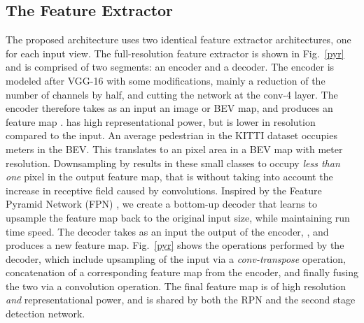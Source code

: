 \documentclass[letterpaper, 10 pt, conference]{ieeeconf}
\newcommand{\fig}[1]{Fig.~\ref{#1}}
\begin{document}
\subsection{The Feature Extractor}
\label{extract}
The proposed architecture uses two identical feature extractor architectures, one for each input view. The full-resolution feature extractor is shown in \fig{pyr} and is comprised of two segments: an encoder and a decoder. The encoder is modeled after VGG-16 \cite{simonyan2014very} with some modifications, mainly a reduction of the number of channels by half, and cutting the network at the conv-4 layer. The encoder therefore takes as an input an  image or BEV map, and produces an  feature map .  has high representational power, but is  lower in resolution compared to the input. An average pedestrian in the KITTI dataset occupies  meters in the BEV. This translates to an  pixel area in a BEV map with  meter resolution. Downsampling by  results in these small classes to occupy \textit{less than one} pixel in the output feature map, that is without taking into account the increase in receptive field caused by convolutions. Inspired by the Feature Pyramid Network (FPN) \cite{lin2017feature}, we create a bottom-up decoder that learns to upsample the feature map back to the original input size, while maintaining run time speed. The decoder takes as an input the output of the encoder, , and produces a new  feature map. \fig{pyr} shows the operations performed by the decoder, which include upsampling of the input via a \textit{conv-transpose} operation, concatenation of a corresponding feature map from the encoder, and finally fusing the two via a  convolution operation. The final feature map is of high resolution \textit{and} representational power, and is shared by both the RPN and the second stage detection network. 
\end{document}
